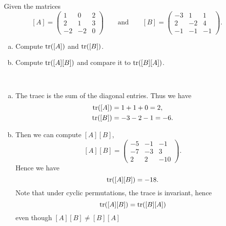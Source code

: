 \documentclass[12pt]{article} %
\begin{document}
\newpage
\begin{problem}
Given the matrices
\[
[A]=\begin{pmatrix} 1 & 0 & 2 \\ 2  & 1 & 3 \\ -2 & -2 & 0 \end{pmatrix} \qquad \textrm{and} \qquad [B]=\begin{pmatrix} -3 & 1 & 1 \\ 2 & -2 & 4 \\ -1 & -1 & -1 \end{pmatrix}.
\]
\begin{enumerate}[(a)]
    \item Compute $\mathrm{tr}([A])$ and $\mathrm{tr}([B])$.  
    \item Compute $\mathrm{tr}([A][B])$ and compare it to $\mathrm{tr}([B][A])$.
\end{enumerate}
\end{problem}
\begin{solution}~
\begin{enumerate}[(a)]
    \item The traec is the sum of the diagonal entries. Thus we have
    \begin{align*}
        \mathrm{tr}([A])&=1+1+0=2,\\
        \mathrm{tr}([B])&=-3-2-1=-6.
    \end{align*}
    \item Then we can compute $[A][B]$,
    \[
    [A][B]=\begin{pmatrix}
    -5 & -1 & -1 \\ -7 & -3 & 3 \\ 2 & 2 & -10
    \end{pmatrix}.
    \]
    Hence we have
    \[
    \mathrm{tr}([A][B]) = -18.
    \]
    Note that under cyclic permutations, the trace is invariant, hence
    \[
    \mathrm{tr}([A][B])=\mathrm{tr}([B][A])
    \]
    even though $[A][B]\neq [B][A]$
    
\end{enumerate}
\end{solution}
\end{document}
